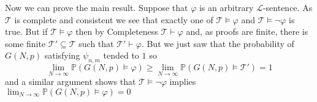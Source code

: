 \documentclass{article}
\begin{document}
\begin{enumerate}[leftmargin=*]
		Now we can prove the main result. Suppose that $\varphi$ is an arbitrary $\mathcal{L}$-sentence. As $\mathcal{T}$ is complete and consistent we see that exactly one of $\mathcal{T}\models \varphi$ and $\mathcal{T}\models \neg\varphi$ is true. But if $\mathcal{T}\models \varphi$ then by Completeness $\mathcal{T}\vdash \varphi$ and, as proofs are finite, there is some finite $\mathcal{T}'\subseteq \mathcal{T}$ such that $\mathcal{T}'\vdash \varphi$. But we just saw that the probability of $G(N,p)$ satisfying $\psi_{n,m}$ tended to $1$ so
		\[
			\lim_{N\to\infty} \mathbb{P}(G(N,p) \models \varphi)\geq \lim_{N\to\infty} \mathbb{P}(G(N,p) \models \mathcal{T}') = 1
		\]
		and a similar argument shows that $\mathcal{T}\models \neg\varphi$ implies $\lim_{N\to\infty} \mathbb{P}(G(N,p) \models \varphi) = 0$
		
	\end{enumerate}
\end{document}
